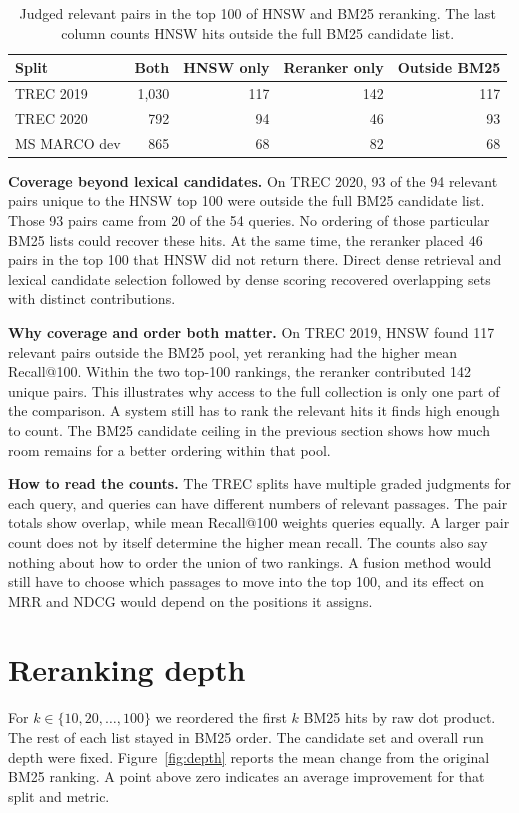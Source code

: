\documentclass[11pt,letterpaper]{article}
\begin{document}
\begin{table}[H]
\centering\small
\caption{Judged relevant pairs in the top 100 of HNSW and BM25 reranking. The last column counts HNSW hits outside the full BM25 candidate list.}
\label{tab:overlap}
\begin{tabular}{@{}lrrrr@{}}
\toprule
Split & Both & HNSW only & Reranker only & Outside BM25\\
\midrule
TREC 2019 & 1,030 & 117 & 142 & 117\\
TREC 2020 & 792 & 94 & 46 & 93\\
MS MARCO dev & 865 & 68 & 82 & 68\\
\bottomrule
\end{tabular}
\end{table}

\textbf{Coverage beyond lexical candidates.} On TREC 2020, 93 of the 94 relevant pairs unique to the HNSW top 100 were outside the full BM25 candidate list. Those 93 pairs came from 20 of the 54 queries. No ordering of those particular BM25 lists could recover these hits. At the same time, the reranker placed 46 pairs in the top 100 that HNSW did not return there. Direct dense retrieval and lexical candidate selection followed by dense scoring recovered overlapping sets with distinct contributions.

\textbf{Why coverage and order both matter.} On TREC 2019, HNSW found 117 relevant pairs outside the BM25 pool, yet reranking had the higher mean Recall@100. Within the two top-100 rankings, the reranker contributed 142 unique pairs. This illustrates why access to the full collection is only one part of the comparison. A system still has to rank the relevant hits it finds high enough to count. The BM25 candidate ceiling in the previous section shows how much room remains for a better ordering within that pool.

\textbf{How to read the counts.} The TREC splits have multiple graded judgments for each query, and queries can have different numbers of relevant passages. The pair totals show overlap, while mean Recall@100 weights queries equally. A larger pair count does not by itself determine the higher mean recall. The counts also say nothing about how to order the union of two rankings. A fusion method would still have to choose which passages to move into the top 100, and its effect on MRR and NDCG would depend on the positions it assigns.

\newpage
\section{Reranking depth}
For $k\in\{10,20,\ldots,100\}$ we reordered the first $k$ BM25 hits by raw dot product. The rest of each list stayed in BM25 order. The candidate set and overall run depth were fixed. Figure~\ref{fig:depth} reports the mean change from the original BM25 ranking. A point above zero indicates an average improvement for that split and metric.
\end{document}
